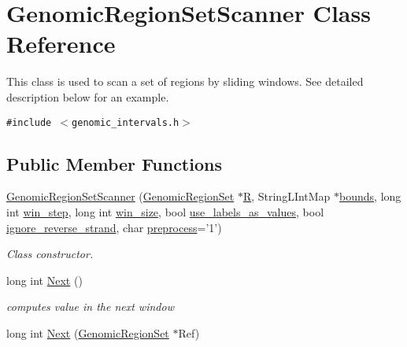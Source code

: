 \hypertarget{classGenomicRegionSetScanner}{
\section{GenomicRegionSetScanner Class Reference}
\label{classGenomicRegionSetScanner}
}
This class is used to scan a set of regions by sliding windows. See detailed description below for an example.  


{\tt \#include $<$genomic\_\-intervals.h$>$}

\subsection*{Public Member Functions}
\begin{CompactItemize}
\item 
\hyperlink{classGenomicRegionSetScanner_2703f6892137282f00618895e02f628b}{GenomicRegionSetScanner} (\hyperlink{classGenomicRegionSet}{GenomicRegionSet} $\ast$\hyperlink{classGenomicRegionSetScanner_f76bf4fef482886f23f58cfa12c3eea1}{R}, StringLIntMap $\ast$\hyperlink{classGenomicRegionSetScanner_7f64551c26331cd4ead1ab01405f1b72}{bounds}, long int \hyperlink{classGenomicRegionSetScanner_b278dfa27c3589865b9243156c1c727f}{win\_\-step}, long int \hyperlink{classGenomicRegionSetScanner_eed625b2a12aa2f7900997c4e20cd9b5}{win\_\-size}, bool \hyperlink{classGenomicRegionSetScanner_d47603d08614ab993fe9036662c421e7}{use\_\-labels\_\-as\_\-values}, bool \hyperlink{classGenomicRegionSetScanner_10c1d22ae74e6f295cd17259f70eff8a}{ignore\_\-reverse\_\-strand}, char \hyperlink{classGenomicRegionSetScanner_f2a536e23023f96c57f51e2276b4be0e}{preprocess}='1')
\begin{CompactList}\small\item\em Class constructor. \item\end{CompactList}\item 
\hypertarget{classGenomicRegionSetScanner_d0e45066dc2f22d3c211d1e7d885bd87}{
long int \hyperlink{classGenomicRegionSetScanner_d0e45066dc2f22d3c211d1e7d885bd87}{Next} ()}
\label{classGenomicRegionSetScanner_d0e45066dc2f22d3c211d1e7d885bd87}

\begin{CompactList}\small\item\em computes value in the next window \item\end{CompactList}\item 
\hypertarget{classGenomicRegionSetScanner_4b8c62b87b640dedb5d37647c5dfb844}{
long int \hyperlink{classGenomicRegionSetScanner_4b8c62b87b640dedb5d37647c5dfb844}{Next} (\hyperlink{classGenomicRegionSet}{GenomicRegionSet} $\ast$Ref)}
\label{classGenomicRegionSetScanner_4b8c62b87b640dedb5d37647c5dfb844}


\end{CompactItemize}
